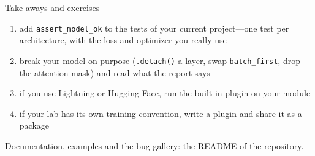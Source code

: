 \documentclass[aspectratio=169,11pt]{beamer}
\begin{document}
\begin{frame}{Take-aways and exercises}
  \begin{enumerate}
    \item add \texttt{assert\_model\_ok} to the tests of your current project---one test per
          architecture, with the loss and optimizer you really use
    \item break your model on purpose (\texttt{.detach()} a layer, swap \texttt{batch\_first},
          drop the attention mask) and read what the report says
    \item if you use Lightning or Hugging Face, run the built-in plugin on your module
    \item if your lab has its own training convention, write a plugin and share it as a package
  \end{enumerate}
  \bigskip
  \small Documentation, examples and the bug gallery: the README of the repository.
\end{frame}
\end{document}
